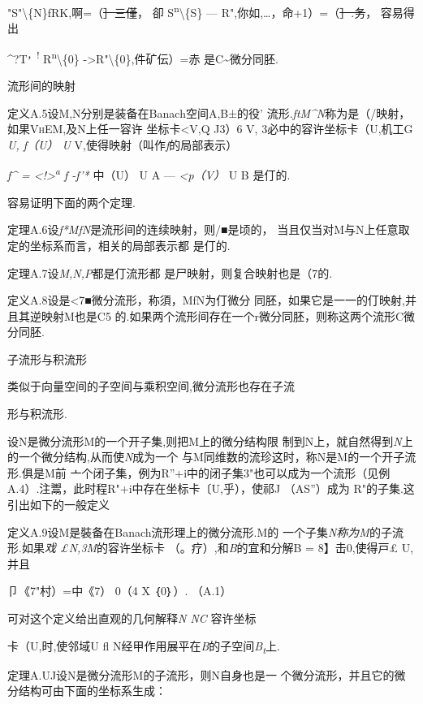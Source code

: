 "S"\textbackslash{}\{N\}fRK,啊=（\sout{］三僅}， 卻
S\textsuperscript{n}\textbackslash{}\{S\} ---
R",你如,\ldots{}，命+1）=（\sout{］.务}， 容易得出

\^{}?T\textsuperscript{，!} R\textsuperscript{n}\textbackslash{}\{0\}
-\textgreater{}R"\textbackslash{}\{0\},件矿伝）=赤
是C\textasciitilde{}微分同胚.

流形间的映射

定义A.5设M,N分别是装备在Banach空间A,B±的役'
流形.\emph{ftM\^{}N}称为是（/映射，如果\textsc{VhEM,}及N上任一容许
坐标卡\textless{}V,Q J3）6 V, 3必中的容许坐标卡（U,机工G \emph{U, f（U）
U} V,使得映射（叫作\emph{f}的局部表示）

\emph{f\^{} = \textless{}!\textgreater{}\textsuperscript{a} f -f'*}
中（U） U A --- \emph{\textless{}p（V）} U B 是仃的.

容易证明下面的两个定理.

定理A.6设\emph{f*MfN}是流形间的连续映射，则/■是顷的，
当且仅当对M与N上任意取定的坐标系而言，相关的局部表示都 是仃的.\textbar{}

定理A.7设\emph{M,N,P}都是仃流形都
是尸映射，则复合映射也是（7的.\textbar{}

定义A.8设是\textless{}7■微分流形，称須，MfN为仃微分
同胚，如果它是一一的仃映射,并且其逆映射M也是C5
的.如果两个流形间存在一个r微分同胚，则称这两个流形C微 分同胚.

子流形与积流形

类似于向量空间的子空间与乘积空间,微分流形也存在子流

形与积流形.

设N是微分流形M的一个开子集,则把M上的微分结构限
制到N上，就自然得到\emph{N}上的一个微分结构,从而使\emph{N}成为一个
与M同维数的流珍这时，称N是M的一个开子流形.俱是M前
亠个闭子集，例为R''+i中的闭子集3"也可以成为一个流形（见例
A.4）.注鬻，此时程R"+i中存在坐标卡〔U,乎），使祁J （AS''）成为
R"的子集.这引出如下的一般定义

定义A.9设M是裝备在Banach流形理上的微分流形.M的
一个子集\emph{N称为M}的子流形.如果\emph{戏 £N,3M}的容许坐标卡
（。疗）,和\emph{B}的宜和分解B = 8】击0,使得戸£ U,并且

卩《7\textbar{}"\textbar{}村）=中《7） 0（4 X ｛0｝）. （A.1）

可对这个定义给出直观的几何解释\emph{N NC} 容许坐标

卡（U,时,使邻域U fl
N经甲作用展平在\emph{B}的子空间\emph{B\textsubscript{t}}上.

定理A.UJ设N是微分流形M的子流形，则N自身也是一
个微分流形，并且它的微分结构可由下面的坐标系生成：

